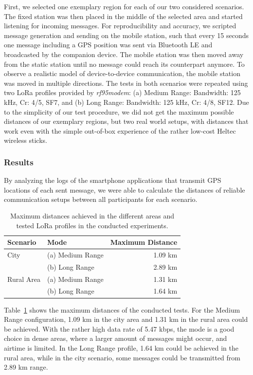 First, we selected one exemplary region for each of our two considered scenarios. 
The fixed station was then placed in the middle of the selected area and started listening for incoming messages.
For reproducibility and accuracy, we scripted message generation and sending on the mobile station, such that every 15 seconds one message including a GPS position was sent via Bluetooth LE and broadcasted by the companion device.
The mobile station was then moved away from the static station until no message could reach its counterpart anymore.
To observe a realistic model of device-to-device communication, the mobile station was moved in multiple directions.
The tests in both scenarios were repeated using two LoRa  profiles provided by \textit{rf95modem}: (a) Medium Range: Bandwidth: 125 kHz, Cr: 4/5, SF7, and (b) Long Range: Bandwidth: 125 kHz, Cr: 4/8, SF12.
Due to the simplicity of our test procedure, we did not get the maximum possible distances of our exemplary regions, but two real world setups, with distances that work even with the simple out-of-box experience of the rather low-cost Heltec wireless sticks.

\subsubsection{Results}

By analyzing the logs of the smartphone applications that transmit GPS locations of each sent message, we were able to calculate the distances of reliable communication setups between all participants for each scenario.

\begin{table}[ht!]
    \centering
    \begin{tabular}{l|lr}
\textbf{Scenario}    & \textbf{Mode}          & \textbf{Maximum Distance} \\\hline
City        & (a) Medium Range  &  1.09 km \\
            & (b) Long Range    &  2.89 km \\
Rural Area  & (a) Medium Range  &  1.31 km \\
            & (b) Long Range   &  1.64 km \\
    \end{tabular}
    \caption{Maximum distances achieved in the different areas and tested LoRa profiles in the conducted experiments.}
    \label{tab:max_dist}
\end{table}

Table~\ref{tab:max_dist} shows the maximum distances of the conducted tests.
For the Medium Range configuration, 1.09 km in the city area and 1.31 km in the rural area could be achieved.
With the rather high data rate of 5.47 kbps, the mode is a good choice in dense areas, where a larger amount of messages might occur, and airtime is limited.
In the Long Range profile, 1.64 km could be achieved in the rural area, while in the city scenario, some messages could be transmitted from 2.89 km range.

